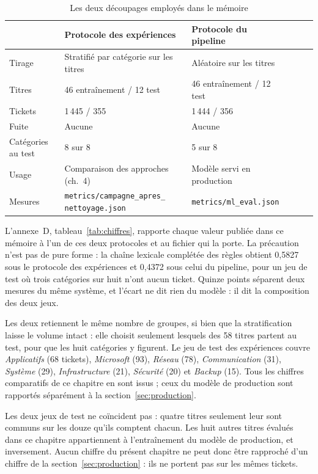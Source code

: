 \begin{table}[!htbp]
\centering
\styletableau
\caption{Les deux découpages employés dans le mémoire}
\label{tab:protocoles}
\begin{tabular}{|Bp{3.4cm}|Lp{5.0cm}|Lp{5.0cm}|}
\hline
{}
& \textbf{Protocole des expériences} & \textbf{Protocole du pipeline} \\
\hline
Tirage & Stratifié par catégorie sur les titres & Aléatoire sur les titres \\
\hline
Titres & 46 entraînement / 12 test & 46 entraînement / 12 test \\
\hline
Tickets & 1\,445 / 355 & 1\,444 / 356 \\
\hline
Fuite & Aucune & Aucune \\
\hline
Catégories au test & 8 sur 8 & 5 sur 8 \\
\hline
Usage & Comparaison des approches (ch.~4) & Modèle servi en production \\
\hline
Mesures & \texttt{metrics/\allowbreak campagne\_\allowbreak apres\_\allowbreak
nettoyage\allowbreak .json} &
\texttt{metrics/\allowbreak ml\_\allowbreak eval\allowbreak .json} \\
\hline
\end{tabular}
\end{table}

L'annexe~D, tableau~\ref{tab:chiffres}, rapporte chaque valeur publiée dans ce mémoire à l'un de ces deux protocoles et au
fichier qui la porte. La précaution n'est pas de pure forme : la chaîne lexicale complétée des
règles obtient 0,5827 sous le protocole des expériences et 0,4372 sous celui du pipeline, pour un
jeu de test où trois catégories sur huit n'ont aucun ticket. Quinze points séparent deux mesures
du même système, et l'écart ne dit rien du modèle : il dit la composition des deux jeux.

Les deux retiennent le même nombre de groupes, si bien que la stratification laisse le volume
intact : elle choisit seulement lesquels des 58 titres partent au test, pour que les huit catégories
y figurent. Le jeu de test des expériences couvre \emph{Applicatifs} (68 tickets), \emph{Microsoft}
(93), \emph{Réseau} (78), \emph{Communication} (31), \emph{Système} (29), \emph{Infrastructure}
(21), \emph{Sécurité} (20) et \emph{Backup} (15). Tous les chiffres comparatifs de ce chapitre en
sont issus ; ceux du modèle de production sont rapportés séparément à la
section~\ref{sec:production}.

Les deux jeux de test ne coïncident pas : quatre titres seulement leur sont communs sur les douze
qu'ils comptent chacun. Les huit autres titres évalués dans ce chapitre appartiennent à
l'entraînement du modèle de production, et inversement. Aucun chiffre du présent chapitre ne peut
donc être rapproché d'un chiffre de la section~\ref{sec:production} : ils ne portent pas sur les
mêmes tickets.

